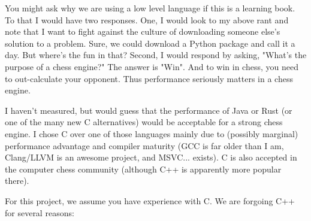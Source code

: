 \documentclass{article}
\begin{document}
You might ask why we are using a low level language if this is a learning book. To that I would have two responses. One, I would look to my above rant and note that I want to fight against the culture of downloading someone else's solution to a problem. Sure, we could download a Python package and call it a day. But where's the fun in that? Second, I would respond by asking, "What's the purpose of a chess engine?" The answer is "Win". And to win in chess, you need to out-calculate your opponent. Thus performance seriously matters in a chess engine.

I haven't measured, but would guess that the performance of Java or Rust (or one of the many new C alternatives) would be acceptable for a strong chess engine. I chose C over one of those languages mainly due to (possibly marginal) performance advantage and compiler maturity (GCC is far older than I am, Clang/LLVM is an awesome project, and MSVC... exists). C is also accepted in the computer chess community (although C++ is apparently more popular there).

For this project, we assume you have experience with C.
We are forgoing C++ for several reasons:
\end{document}
